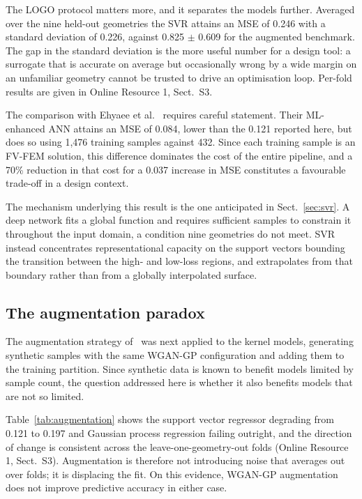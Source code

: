 \documentclass[iicol,pdflatex,sn-basic,Numbered]{sn-jnl}
\begin{document}
The LOGO protocol matters more, and it separates the models further. Averaged
over the nine held-out geometries the SVR attains an MSE of 0.246 with a standard
deviation of 0.226, against 0.825 $\pm$ 0.609 for the augmented benchmark. The
gap in the standard deviation is the more useful number for a design tool: a
surrogate that is accurate on average but occasionally wrong by a wide margin on
an unfamiliar geometry cannot be trusted to drive an optimisation loop. Per-fold
results are given in Online Resource 1, Sect.~S3.

The comparison with Ehyaee et al.~\cite{ehyaee2024} requires careful statement.
Their ML-enhanced ANN attains an MSE of 0.084, lower than the 0.121 reported
here, but does so using 1,476 training samples against 432. Since each training
sample is an FV-FEM solution, this difference dominates the cost of the entire
pipeline, and a 70\% reduction in that cost for a 0.037 increase in MSE
constitutes a favourable trade-off in a design context.

The mechanism underlying this result is the one anticipated in
Sect.~\ref{sec:svr}. A deep network fits a global function and requires
sufficient samples to constrain it throughout the input domain, a condition nine
geometries do not meet. SVR instead concentrates representational capacity on the
support vectors bounding the transition between the high- and low-loss regions,
and extrapolates from that boundary rather than from a globally interpolated
surface.

\subsection{The augmentation paradox}\label{sec:paradox}

The augmentation strategy of~\cite{zelaci2021} was next applied to the kernel
models, generating synthetic samples with the same WGAN-GP configuration and
adding them to the training partition. Since synthetic data is known to benefit
models limited by sample count, the question addressed here is whether it also
benefits models that are not so limited.

Table~\ref{tab:augmentation} shows the support vector regressor degrading from
0.121 to 0.197 and Gaussian process regression failing outright, and the
direction of change is consistent across the leave-one-geometry-out folds
(Online Resource 1, Sect.~S3). Augmentation is therefore not introducing noise
that averages out over folds; it is displacing the fit. On this evidence,
WGAN-GP augmentation does not improve predictive accuracy in either case.
\end{document}
